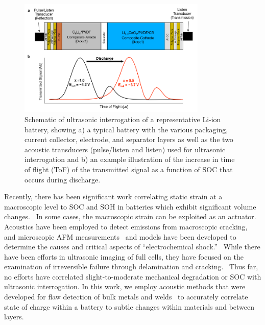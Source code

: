 \begin{figure}[htb]
  \centering
    \includegraphics[width=0.8\textwidth]{ch4-bw/images/bwschem.png}
    \caption[Schematic of ultrasonic interrogation of a representative Li-ion battery.]{Schematic of ultrasonic interrogation of a representative Li-ion battery, showing a) a typical battery with the various packaging, current collector, electrode, and separator layers as well as the two acoustic transducers (pulse/listen and listen) used for ultrasonic interrogation and b) an example illustration of the increase in time of flight (ToF) of the transmitted signal as a function of SOC that occurs during discharge.}
    \label{fig:bwschem}
\end{figure}

Recently, there has been significant work correlating static strain at a macroscopic level to SOC and SOH in batteries which exhibit significant volume changes.~\cite{cannarella_ion, cannarella_stress, Deshpande2012-wk, J2014-cd, Cannarella2014-ej} In some cases, the macroscopic strain can be exploited as an actuator.~\cite{Koyama2006-hm} Acoustics have been employed to detect emissions from macroscopic cracking,~\cite{Kircheva2011-ji, Komagata2010-sw, etiemble, Didier-Laurent2008-tt} and microscopic AFM measurements~\cite{Rhodes2010-nr, rhodes} and models have been developed to determine the causes and critical aspects of “electrochemical shock.”~\cite{Woodford2014-tq, Woodford2010-vd, Woodford2012-fq, Woodford2014-gy} While there have been efforts in ultrasonic imaging of full cells, they have focused on the examination of irreversible failure through delamination and cracking.~\cite{Sood2013-bo, Sood2013-yf} Thus far, no efforts have correlated slight-to-moderate mechanical degradation or SOC with ultrasonic interrogation. In this work, we employ acoustic methods that were developed for flaw detection of bulk metals and welds~\cite{Vary1982-dy, Banks1963-vo, Furgason1975-md} to accurately correlate state of charge within a battery to subtle changes within materials and between layers.